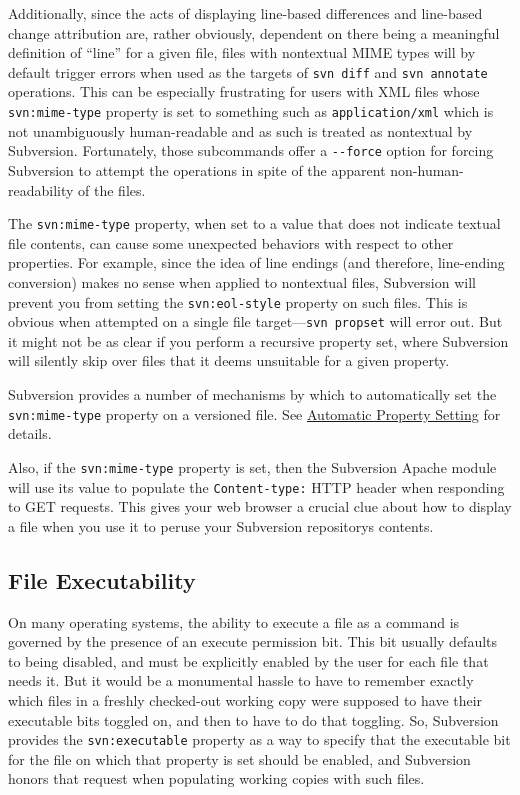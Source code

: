 Additionally, since the acts of displaying line-based differences and
line-based change attribution are, rather obviously, dependent on there
being a meaningful definition of ``line'' for a given file, files with
nontextual MIME types will by default trigger errors when used as the
targets of \texttt{svn\ diff} and \texttt{svn\ annotate} operations.
This can be especially frustrating for users with XML files whose
\texttt{svn:mime-type} property is set to something such as
\texttt{application/xml} which is not unambiguously human-readable and
as such is treated as nontextual by Subversion. Fortunately, those
subcommands offer a \texttt{-\/-force} option for forcing Subversion to
attempt the operations in spite of the apparent non-human-readability of
the files.

The \texttt{svn:mime-type} property, when set to a value that does not
indicate textual file contents, can cause some unexpected behaviors with
respect to other properties. For example, since the idea of line endings
(and therefore, line-ending conversion) makes no sense when applied to
nontextual files, Subversion will prevent you from setting the
\texttt{svn:eol-style} property on such files. This is obvious when
attempted on a single file target---\texttt{svn\ propset} will error
out. But it might not be as clear if you perform a recursive property
set, where Subversion will silently skip over files that it deems
unsuitable for a given property.

Subversion provides a number of mechanisms by which to automatically set
the \texttt{svn:mime-type} property on a versioned file. See
\hyperref[svn.advanced.props.auto]{Automatic Property Setting} for
details.

Also, if the \texttt{svn:mime-type} property is set, then the Subversion
Apache module will use its value to populate the \texttt{Content-type:}
HTTP header when responding to GET requests. This gives your web browser
a crucial clue about how to display a file when you use it to peruse
your Subversion repository\textquotesingle s contents.

\subsection{File
Executability}\label{svn.advanced.props.special.executable}

On many operating systems, the ability to execute a file as a command is
governed by the presence of an execute permission bit. This bit usually
defaults to being disabled, and must be explicitly enabled by the user
for each file that needs it. But it would be a monumental hassle to have
to remember exactly which files in a freshly checked-out working copy
were supposed to have their executable bits toggled on, and then to have
to do that toggling. So, Subversion provides the \texttt{svn:executable}
property as a way to specify that the executable bit for the file on
which that property is set should be enabled, and Subversion honors that
request when populating working copies with such files.

